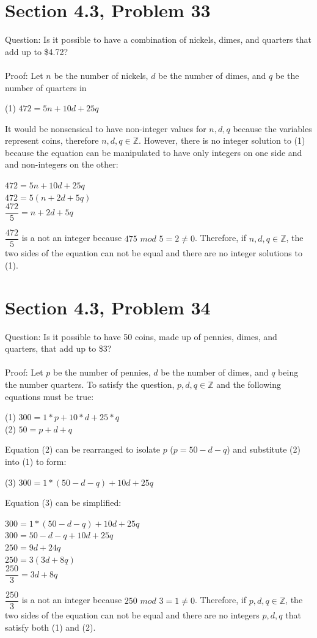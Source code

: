 \documentclass{article}
\author{Nathan Stouffer}
\begin{document}
\section*{Section 4.3, Problem 33}
Question: Is it possible to have a combination of nickels, dimes, and quarters that add up to \$4.72?
\\\\
Proof: Let $n$ be the number of nickels, $d$ be the number of dimes, and $q$ be the number of quarters in 
\begin{center}
	(1) $472=5n+10d+25q$
\end{center}
It would be nonsensical to have non-integer values for $n,d,q$ because the variables represent coins, therefore $n,d,q\in\mathbb{Z}$. However, there is no integer solution to (1) because the equation can be manipulated to have only integers on one side and and non-integers on the other:
\begin{center}
	$472=5n+10d+25q$\\
	$472=5(n+2d+5q)$\\
	$\dfrac{472}{5}=n+2d+5q$
\end{center}
$\dfrac{472}{5}$ is a not an integer because $475$ $mod$ $5=2\neq0$. Therefore, if $n,d,q\in\mathbb{Z}$, the two sides of the equation can not be equal and there are no integer solutions to (1).

\section*{Section 4.3, Problem 34}
Question: Is it possible to have 50 coins, made up of pennies, dimes, and quarters, that add up to \$3?
\\\\
Proof: Let $p$ be the number of pennies, $d$ be the number of dimes, and $q$ being the number quarters. To satisfy the question, $p,d,q\in\mathbb{Z}$ and the following equations must be true:
\begin{center}
	(1) $300=1*p+10*d+25*q$\\
	(2) $50=p+d+q$
\end{center}
Equation (2) can be rearranged to isolate $p$ ($p=50-d-q$) and substitute (2) into (1) to form:
\begin{center}
	(3) $300=1*(50-d-q)+10d+25q$
\end{center}
Equation (3) can be simplified:
\begin{center}
	$300=1*(50-d-q)+10d+25q$\\
	$300=50-d-q+10d+25q$\\
	$250=9d+24q$\\
	$250=3(3d+8q)$\\
	$\dfrac{250}{3}=3d+8q$
\end{center}
$\dfrac{250}{3}$ is a not an integer because $250$ $mod$ $3=1\neq0$. Therefore, if $p,d,q\in\mathbb{Z}$, the two sides of the equation can not be equal and there are no integers $p,d,q$ that satisfy both (1) and (2).
\end{document}
